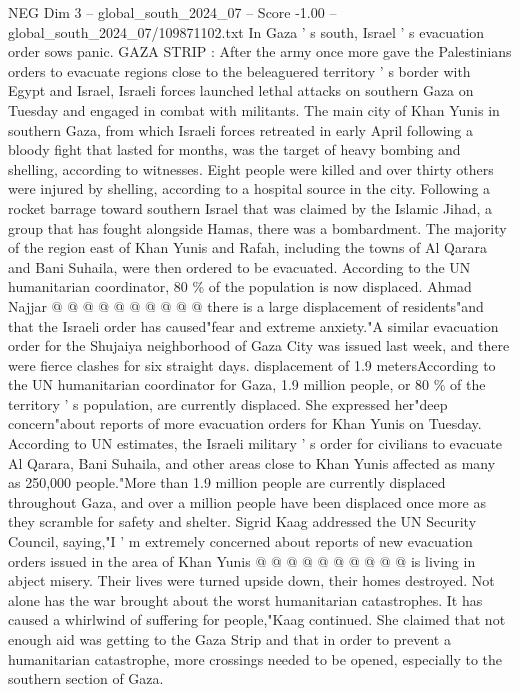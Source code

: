 \begin{textsample}{NEG Dim 3 – global\_south\_2024\_07 – Score -1.00 – global\_south\_2024\_07/109871102.txt}  \label{ex:f3_neg_147}
In Gaza ' s south, Israel ' s evacuation order sows panic.
GAZA STRIP : After the army once more gave the Palestinians orders to evacuate regions close to the beleaguered territory ' s border with Egypt and Israel, Israeli forces launched lethal attacks on southern Gaza on Tuesday and engaged in combat with militants.
The main city of Khan Yunis in southern Gaza, from which Israeli forces retreated in early April following a bloody fight that lasted for months, was the target of heavy bombing and shelling, according to witnesses.
Eight people were killed and over thirty others were injured by shelling, according to a hospital source in the city.
Following a rocket barrage toward southern Israel that was claimed by the Islamic Jihad, a group that has fought alongside Hamas, there was a bombardment.
The majority of the region east of Khan Yunis and Rafah, including the towns of Al Qarara and Bani Suhaila, were then ordered to be evacuated.
According to the UN humanitarian coordinator, 80 \% of the population is now displaced.
Ahmad Najjar @ @ @ @ @ @ @ @ @ @ there is a large displacement of residents"and that the Israeli order has caused"fear and extreme anxiety."A similar evacuation order for the Shujaiya neighborhood of Gaza City was issued last week, and there were fierce clashes for six straight days. displacement of 1.9 metersAccording to the UN humanitarian coordinator for Gaza, 1.9 million people, or 80 \% of the territory ' s population, are currently displaced.
She expressed her"deep concern"about reports of more evacuation orders for Khan Yunis on Tuesday.
According to UN estimates, the Israeli military ' s order for civilians to evacuate Al Qarara, Bani Suhaila, and other areas close to Khan Yunis affected as many as 250,000 people."More than 1.9 million people are currently displaced throughout Gaza, and over a million people have been displaced once more as they scramble for safety and shelter.
Sigrid Kaag addressed the UN Security Council, saying,"I ' m extremely concerned about reports of new evacuation orders issued in the area of Khan Yunis @ @ @ @ @ @ @ @ @ @ is living in abject misery.
Their lives were turned upside down, their homes destroyed.
Not alone has the war brought about the worst humanitarian catastrophes.
It has caused a whirlwind of suffering for people,"Kaag continued.
She claimed that not enough aid was getting to the Gaza Strip and that in order to prevent a humanitarian catastrophe, more crossings needed to be opened, especially to the southern section of Gaza.

\end{textsample}
